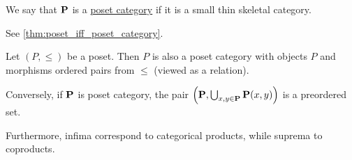 \begin{definition}\label{def:poset_category}
  We say that $\operatorname{\mathbf{P}}$ is a \ul{poset category} if it is a small thin skeletal category.

  See \cref{thm:poset_iff_poset_category}.
\end{definition}

\begin{proposition}\label{thm:poset_iff_poset_category}
  Let $(P, \leq)$ be a poset. Then $P$ is also a poset category with objects $P$ and morphisms ordered pairs from $\leq$ (viewed as a relation).

  Conversely, if $\operatorname{\mathbf{P}}$ is poset category, the pair $\left(\operatorname{\mathbf{P}}, \bigcup_{x, y \in \operatorname{\mathbf{P}}} \operatorname{\mathbf{P}}(x, y) \right)$ is a preordered set.

  Furthermore, infima correspond to categorical products, while suprema to coproducts.
\end{proposition}
